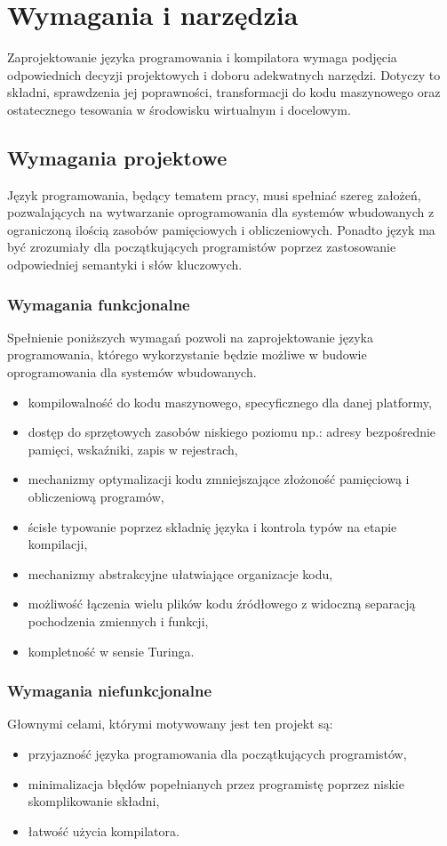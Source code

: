 \chapter{Wymagania i narzędzia}
\label{ch:wymagania-i-narzedzia}
Zaprojektowanie języka programowania i kompilatora wymaga podjęcia odpowiednich decyzji projektowych i doboru adekwatnych narzędzi. Dotyczy to składni, sprawdzenia jej poprawności, transformacji do kodu maszynowego oraz ostatecznego tesowania w środowisku wirtualnym i docelowym.
\section{Wymagania projektowe}

Język programowania, będący tematem pracy, musi spełniać szereg założeń, pozwalających na wytwarzanie oprogramowania dla systemów wbudowanych z ograniczoną ilością zasobów pamięciowych i obliczeniowych. Ponadto język ma być zrozumiały dla początkujących programistów poprzez zastosowanie odpowiedniej semantyki i słów kluczowych.

\subsection{Wymagania funkcjonalne}
Spełnienie poniższych wymagań pozwoli na zaprojektowanie języka programowania, którego wykorzystanie będzie możliwe w budowie oprogramowania dla systemów wbudowanych. 
\begin{itemize}
\item kompilowalność do kodu maszynowego, specyficznego dla danej platformy,
\item dostęp do sprzętowych zasobów niskiego poziomu np.: adresy bezpośrednie pamięci, wskaźniki, zapis w rejestrach,
\item mechanizmy optymalizacji kodu zmniejszające złożoność pamięciową i obliczeniową programów,
\item ścisłe typowanie poprzez składnię języka i kontrola typów na etapie kompilacji,
\item mechanizmy abstrakcyjne ułatwiające organizacje kodu,
\item możliwość łączenia wielu plików kodu źródłowego z widoczną separacją pochodzenia zmiennych i funkcji,
\item kompletność w sensie Turinga.
\end{itemize}

\subsection{Wymagania niefunkcjonalne}
Głownymi celami, którymi motywowany jest ten projekt są:
\begin{itemize}
\item przyjazność języka programowania dla początkujących programistów,
\item minimalizacja błędów popełnianych przez programistę poprzez niskie skomplikowanie składni,
\item łatwość użycia kompilatora.
\end{itemize}

